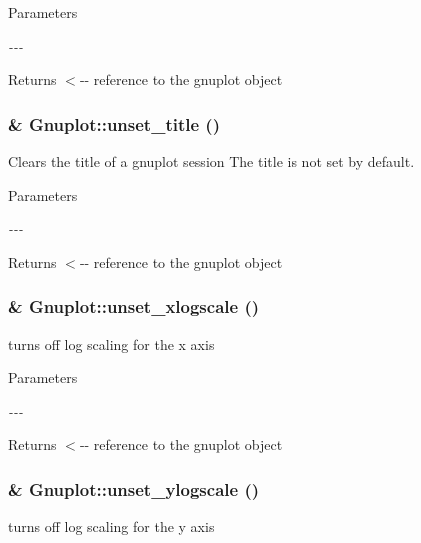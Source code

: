\begin{DoxyParams}{Parameters}
\item[{\em -\/-\/-\/}]\end{DoxyParams}
\begin{DoxyReturn}{Returns}
$<$-\/-\/ reference to the gnuplot object 
\end{DoxyReturn}
\hypertarget{class_gnuplot_aca0aeb1dc0ac8d7e68ba6a15a977be28}{
\subsubsection[{unset\_\-title}]{\& Gnuplot::unset\_\-title ()}}
\label{class_gnuplot_aca0aeb1dc0ac8d7e68ba6a15a977be28}


Clears the title of a gnuplot session The title is not set by default. 


\begin{DoxyParams}{Parameters}
\item[{\em -\/-\/-\/}]\end{DoxyParams}
\begin{DoxyReturn}{Returns}
$<$-\/-\/ reference to the gnuplot object 
\end{DoxyReturn}
\hypertarget{class_gnuplot_a7b178184260f1498cd0c11a197ea0ac2}{
\subsubsection[{unset\_\-xlogscale}]{\& Gnuplot::unset\_\-xlogscale ()}}
\label{class_gnuplot_a7b178184260f1498cd0c11a197ea0ac2}
turns off log scaling for the x axis


\begin{DoxyParams}{Parameters}
\item[{\em -\/-\/-\/}]\end{DoxyParams}
\begin{DoxyReturn}{Returns}
$<$-\/-\/ reference to the gnuplot object 
\end{DoxyReturn}
\hypertarget{class_gnuplot_a9217543dd49c4802b1194d42c5e10b6d}{
\subsubsection[{unset\_\-ylogscale}]{\& Gnuplot::unset\_\-ylogscale ()}}
\label{class_gnuplot_a9217543dd49c4802b1194d42c5e10b6d}
turns off log scaling for the y axis


